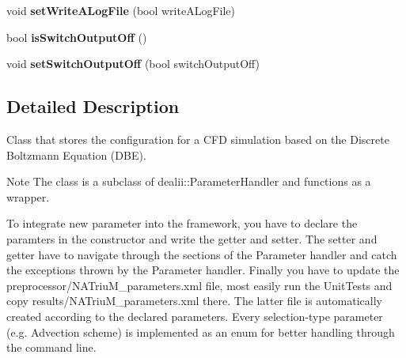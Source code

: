 \begin{DoxyCompactItemize}
\item 
\hypertarget{classnatrium_1_1SolverConfiguration_a6e50f8fc372b4346ba9f309d5d5f47b3}{void {\bfseries set\-Write\-A\-Log\-File} (bool write\-A\-Log\-File)}\label{classnatrium_1_1SolverConfiguration_a6e50f8fc372b4346ba9f309d5d5f47b3}

\item 
\hypertarget{classnatrium_1_1SolverConfiguration_ae4852378b026ccc913732eb8b20eca74}{bool {\bfseries is\-Switch\-Output\-Off} ()}\label{classnatrium_1_1SolverConfiguration_ae4852378b026ccc913732eb8b20eca74}

\item 
\hypertarget{classnatrium_1_1SolverConfiguration_afcae7f43456c2a127c242b230ea3a8a2}{void {\bfseries set\-Switch\-Output\-Off} (bool switch\-Output\-Off)}\label{classnatrium_1_1SolverConfiguration_afcae7f43456c2a127c242b230ea3a8a2}

\end{DoxyCompactItemize}


\subsection{Detailed Description}
Class that stores the configuration for a C\-F\-D simulation based on the Discrete Boltzmann Equation (D\-B\-E). 

\begin{DoxyNote}{Note}
The class is a subclass of dealii\-::\-Parameter\-Handler and functions as a wrapper. 

To integrate new parameter into the framework, you have to declare the paramters in the constructor and write the getter and setter. The setter and getter have to navigate through the sections of the Parameter handler and catch the exceptions thrown by the Parameter handler. Finally you have to update the preprocessor/\-N\-A\-Triu\-M\-\_\-parameters.\-xml file, most easily run the Unit\-Tests and copy results/\-N\-A\-Triu\-M\-\_\-parameters.\-xml there. The latter file is automatically created according to the declared parameters. Every selection-\/type parameter (e.\-g. Advection scheme) is implemented as an enum for better handling through the command line. 
\end{DoxyNote}


